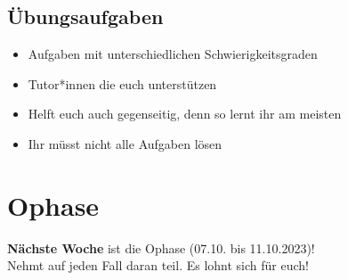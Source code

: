 \subsection{Übungsaufgaben}
\begin{frame}
    \slidehead
    \begin{itemize}
        \item Aufgaben mit unterschiedlichen Schwierigkeitsgraden
        \item Tutor*innen
            die euch unterstützen
        \item Helft euch auch gegenseitig, denn so lernt ihr am meisten
        \item Ihr müsst nicht alle Aufgaben lösen
    \end{itemize}
\end{frame}

\section{Ophase}
\begin{frame}
    \slidehead
    \textbf{Nächste Woche} ist die Ophase (07.10. bis 11.10.2023)! \\
    Nehmt auf jeden Fall daran teil. Es lohnt sich für euch!
\end{frame}



